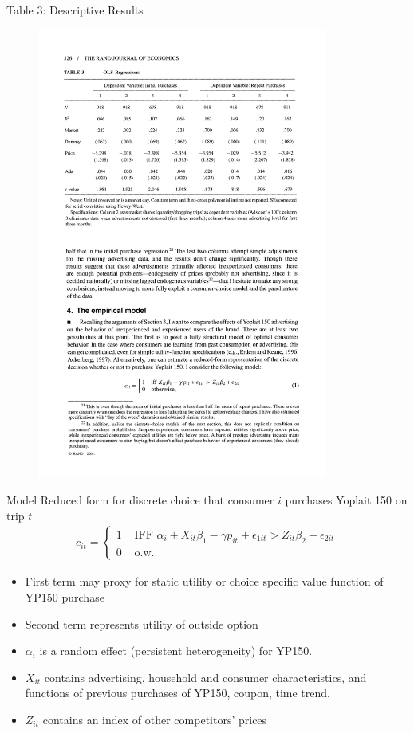 \documentclass[xcolor=pdftex,dvipsnames,table,mathserif,aspectratio=169]{beamer}
\begin{document}
\begin{frame}{Table 3: Descriptive Results}
\begin{figure}[htbp]
\begin{center}
\includegraphics[width=9.5cm]{resources/acker3.pdf}
\label{default}
\end{center}
\end{figure}
\end{frame}



\begin{frame}{Model}
Reduced form for discrete choice that consumer $i$ purchases Yoplait 150 on trip $t$
\begin{eqnarray*}
c_{it} = \begin{cases}
       1 & \mbox{ IFF } \alpha_i + X_{it} \beta_1 - \gamma p_{it} + \epsilon_{1it} > Z_{it} \beta_2 + \epsilon_{2it}\\
       0 & \mbox{ o.w. } 
        \end{cases}
\end{eqnarray*}
\begin{itemize}
\item First term may \alert{proxy} for static utility or choice specific value function of YP150 purchase
\item Second term represents utility of outside option
\item $\alpha_i$ is a random effect (persistent heterogeneity) for YP150.
\item $X_{it}$ contains \alert{advertising}, household and consumer characteristics, and functions of previous purchases of YP150, coupon, time trend.
\item $Z_{it}$ contains an index of other competitors' prices
\end{itemize}
\end{frame}
\end{document}
